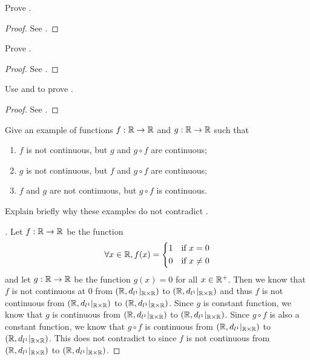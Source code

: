 \exercisesection

\begin{ex}\label{ii:ex:2.1.1}
  Prove .
\end{ex}

\begin{proof}
  See .
\end{proof}

\begin{ex}\label{ii:ex:2.1.2}
  Prove .
\end{ex}

\begin{proof}
  See .
\end{proof}

\begin{ex}\label{ii:ex:2.1.3}
  Use  and  to prove .
\end{ex}

\begin{proof}
  See .
\end{proof}

\begin{ex}\label{ii:ex:2.1.4}
  Give an example of functions \(f : \mathbb{R} \to \mathbb{R}\) and \(g : \mathbb{R} \to \mathbb{R}\) such that
  \begin{enumerate}
    \item\label{ii:ex:2.1.4.a} \(f\) is not continuous, but \(g\) and \(g \circ f\) are continuous;
    \item\label{ii:ex:2.1.4.b} \(g\) is not continuous, but \(f\) and \(g \circ f\) are continuous;
    \item\label{ii:ex:2.1.4.c} \(f\) and \(g\) are not continuous, but \(g \circ f\) is continuous.
  \end{enumerate}
  Explain briefly why these examples do not contradict .
\end{ex}

\begin{proof}[]
  Let \(f : \mathbb{R} \to \mathbb{R}\) be the function
  \[
    \forall x \in \mathbb{R}, f(x) = \begin{dcases}
      1 & \text{if } x = 0    \\
      0 & \text{if } x \neq 0
    \end{dcases}
  \]
  and let \(g : \mathbb{R} \to \mathbb{R}\) be the function \(g(x) = 0\) for all \(x \in \mathbb{R}^+\).
  Then we know that \(f\) is not continuous at \(0\) from \((\mathbb{R}, d_{l^1}|_{\mathbb{R} \times \mathbb{R}})\) to \((\mathbb{R}, d_{l^1}|_{\mathbb{R} \times \mathbb{R}})\) and thus \(f\) is not continuous from \((\mathbb{R}, d_{l^1}|_{\mathbb{R} \times \mathbb{R}})\) to \((\mathbb{R}, d_{l^1}|_{\mathbb{R} \times \mathbb{R}})\).
  Since \(g\) is constant function, we know that \(g\) is continuous from \((\mathbb{R}, d_{l^1}|_{\mathbb{R} \times \mathbb{R}})\) to \((\mathbb{R}, d_{l^1}|_{\mathbb{R} \times \mathbb{R}})\).
  Since \(g \circ f\) is also a constant function, we know that \(g \circ f\) is continuous from \((\mathbb{R}, d_{l^1}|_{\mathbb{R} \times \mathbb{R}})\) to \((\mathbb{R}, d_{l^1}|_{\mathbb{R} \times \mathbb{R}})\).
  This does not contradict to  since \(f\) is not continuous from \((\mathbb{R}, d_{l^1}|_{\mathbb{R} \times \mathbb{R}})\) to \((\mathbb{R}, d_{l^1}|_{\mathbb{R} \times \mathbb{R}})\).
\end{proof}

